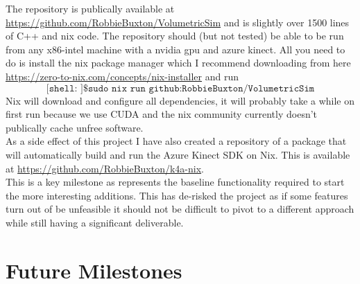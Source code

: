 The repository is publically available at \url{https://github.com/RobbieBuxton/VolumetricSim} and is slightly over 1500 lines of C++ and nix code. The repository should (but not tested) be able to be run from any x86-intel machine with a nvidia gpu and azure kinect. All you need to do is install the nix package manager which I recommend downloading from here \url{https://zero-to-nix.com/concepts/nix-installer} and run 
\[\texttt{[shell:~]\$ sudo nix run github:RobbieBuxton/VolumetricSim}\]
 Nix will download and configure all dependencies, it will probably take a while on first run because we use CUDA and the nix community currently doesn't publically cache unfree software. \\

As a side effect of this project I have also created a repository of a package that will automatically build and run the Azure Kinect SDK on Nix. This is available at \url{https://github.com/RobbieBuxton/k4a-nix}. \\

This is a key milestone as represents the baseline functionality required to start the more interesting additions. This has de-risked the project as if some features turn out of be unfeasible it should not be difficult to pivot to a different approach while still having a significant deliverable.

\section{Future Milestones}
